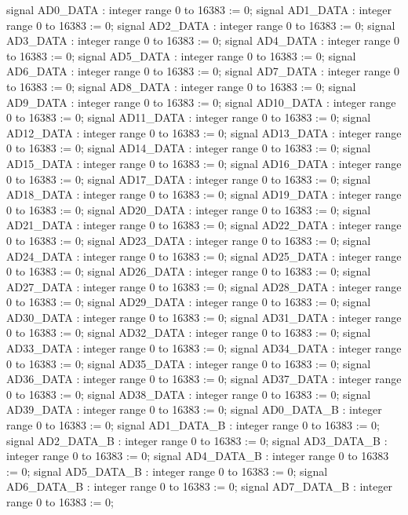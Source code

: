 \begin{mylisting}[language=VHDL,caption=AD変換モジュール,label=appF_ADC_module_VHDL]
	signal AD0_DATA			: integer range 0 to 16383			:= 0;
	signal AD1_DATA			: integer range 0 to 16383			:= 0;
	signal AD2_DATA			: integer range 0 to 16383			:= 0;
	signal AD3_DATA			: integer range 0 to 16383			:= 0;
	signal AD4_DATA			: integer range 0 to 16383			:= 0;
	signal AD5_DATA			: integer range 0 to 16383			:= 0;
	signal AD6_DATA			: integer range 0 to 16383			:= 0;
	signal AD7_DATA			: integer range 0 to 16383			:= 0;
	signal AD8_DATA			: integer range 0 to 16383			:= 0;
	signal AD9_DATA			: integer range 0 to 16383			:= 0;
	signal AD10_DATA		: integer range 0 to 16383			:= 0;
	signal AD11_DATA		: integer range 0 to 16383			:= 0;
	signal AD12_DATA		: integer range 0 to 16383			:= 0;
	signal AD13_DATA		: integer range 0 to 16383			:= 0;
	signal AD14_DATA		: integer range 0 to 16383			:= 0;
	signal AD15_DATA		: integer range 0 to 16383			:= 0;
	signal AD16_DATA		: integer range 0 to 16383			:= 0;
	signal AD17_DATA		: integer range 0 to 16383			:= 0;
	signal AD18_DATA		: integer range 0 to 16383			:= 0;
	signal AD19_DATA		: integer range 0 to 16383			:= 0;
	signal AD20_DATA		: integer range 0 to 16383			:= 0;
	signal AD21_DATA		: integer range 0 to 16383			:= 0;
	signal AD22_DATA		: integer range 0 to 16383			:= 0;
	signal AD23_DATA		: integer range 0 to 16383			:= 0;
	signal AD24_DATA		: integer range 0 to 16383			:= 0;
	signal AD25_DATA		: integer range 0 to 16383			:= 0;
	signal AD26_DATA		: integer range 0 to 16383			:= 0;
	signal AD27_DATA		: integer range 0 to 16383			:= 0;
	signal AD28_DATA		: integer range 0 to 16383			:= 0;
	signal AD29_DATA		: integer range 0 to 16383			:= 0;
	signal AD30_DATA		: integer range 0 to 16383			:= 0;
	signal AD31_DATA		: integer range 0 to 16383			:= 0;
	signal AD32_DATA		: integer range 0 to 16383			:= 0;
	signal AD33_DATA		: integer range 0 to 16383			:= 0;
	signal AD34_DATA		: integer range 0 to 16383			:= 0;
	signal AD35_DATA		: integer range 0 to 16383			:= 0;
	signal AD36_DATA		: integer range 0 to 16383			:= 0;
	signal AD37_DATA		: integer range 0 to 16383			:= 0;
	signal AD38_DATA		: integer range 0 to 16383			:= 0;
	signal AD39_DATA		: integer range 0 to 16383			:= 0;
	signal AD0_DATA_B		: integer range 0 to 16383			:= 0;
	signal AD1_DATA_B		: integer range 0 to 16383			:= 0;
	signal AD2_DATA_B		: integer range 0 to 16383			:= 0;
	signal AD3_DATA_B		: integer range 0 to 16383			:= 0;
	signal AD4_DATA_B		: integer range 0 to 16383			:= 0;
	signal AD5_DATA_B		: integer range 0 to 16383			:= 0;
	signal AD6_DATA_B		: integer range 0 to 16383			:= 0;
	signal AD7_DATA_B		: integer range 0 to 16383			:= 0;

\end{mylisting}
